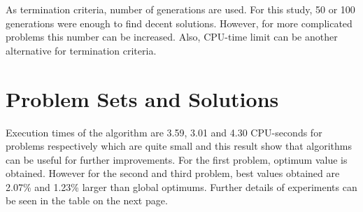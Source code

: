\documentclass[11pt]{article}
\begin{document}
As termination criteria, number of generations are used. For this study, 50 or 100 generations were enough to find decent solutions. However, for more complicated problems this number can be increased. Also, CPU-time limit can be another alternative for termination criteria.


    \hypertarget{probsets}{%
\section{Problem Sets and Solutions}\label{probsets}}

Execution times of the algorithm are 3.59, 3.01 and 4.30 CPU-seconds for problems respectively which are quite small and this result show that algorithms can be useful for further improvements.  For the first problem, optimum value is obtained. However for the second and third problem, best values obtained are 2.07\% and 1.23\% larger than global optimums. Further details of experiments can be seen in the table on the next page.


\pagebreak
\end{document}
